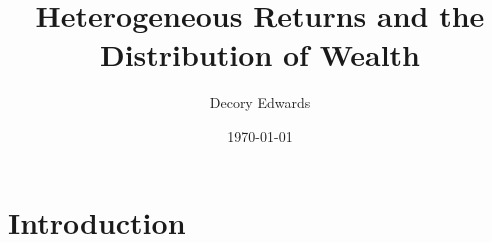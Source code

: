 \documentclass{beamer}
\title[]{Heterogeneous Returns and the Distribution of Wealth}
\author[Edwards]{Decory Edwards}
\institute[JHU]{Johns Hopkins University}
\date{\today}
\begin{document}
\begin{frame}
  \titlepage
\end{frame}

\section{Introduction}












    
\end{document}
